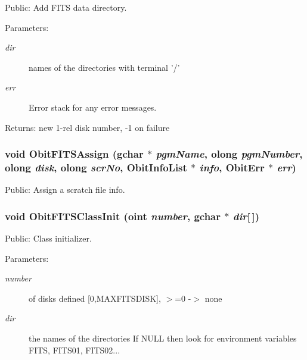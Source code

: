 Public: Add FITS data directory. 

\begin{Desc}
\item[Parameters:]
\begin{description}
\item[{\em dir}]names of the directories with terminal '/' \item[{\em err}]Error stack for any error messages. \end{description}
\end{Desc}
\begin{Desc}
\item[Returns:]new 1-rel disk number, -1 on failure \end{Desc}
\subsubsection{\setlength{\rightskip}{0pt plus 5cm}void Obit\-FITSAssign (gchar $\ast$ {\em pgm\-Name}, {\bf olong} {\em pgm\-Number}, {\bf olong} {\em disk}, {\bf olong} {\em scr\-No}, {\bf Obit\-Info\-List} $\ast$ {\em info}, {\bf Obit\-Err} $\ast$ {\em err})}\label{ObitFITS_8c_a9}


Public: Assign a scratch file info. 

\subsubsection{\setlength{\rightskip}{0pt plus 5cm}void Obit\-FITSClass\-Init ({\bf oint} {\em number}, gchar $\ast$ {\em dir}[$\,$])}\label{ObitFITS_8c_a2}


Public: Class initializer. 

\begin{Desc}
\item[Parameters:]
\begin{description}
\item[{\em number}]of disks defined [0,MAXFITSDISK], $>$=0 -$>$ none \item[{\em dir}]the names of the directories If NULL then look for environment variables FITS, FITS01, FITS02... \end{description}
\end{Desc}
